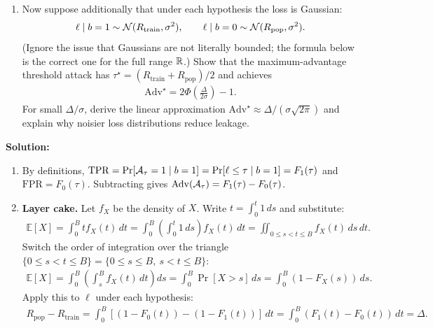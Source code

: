 \documentclass[12pt]{article}
\newcommand{\fE}{\mathbb{E}}
\begin{document}
\begin{enumerate}
\begin{enumerate}
    \item Now suppose additionally that under each hypothesis the loss is Gaussian:
    \begin{align*}
        \ell \mid b=1 \sim {\mathcal{N}}(R_{\mathrm{train}}, \sigma^2), \qquad \ell \mid b=0 \sim {\mathcal{N}}(R_{\mathrm{pop}}, \sigma^2).
    \end{align*}
    (Ignore the issue that Gaussians are not literally bounded; the formula below is the correct one for the full range ${\mathbb{R}}$.) Show that the maximum-advantage threshold attack has $\tau^\star = (R_{\mathrm{train}} + R_{\mathrm{pop}})/2$ and achieves
    \begin{align*}
        \mathrm{Adv}^\star = 2\Phi\!\left(\frac{\Delta}{2\sigma}\right) - 1.
    \end{align*}
    For small $\Delta/\sigma$, derive the linear approximation $\mathrm{Adv}^\star \approx \Delta/(\sigma\sqrt{2\pi})$ and explain why noisier loss distributions reduce leakage.
\end{enumerate}

\begin{solution}
{\bf Solution:}\\
\begin{enumerate}
    \item By definitions, $\mathrm{TPR} = \Pr[{\mathcal{A}}_\tau = 1 \mid b = 1] = \Pr[\ell \le \tau \mid b = 1] = F_1(\tau)$ and $\mathrm{FPR} = F_0(\tau)$. Subtracting gives $\mathrm{Adv}({\mathcal{A}}_\tau) = F_1(\tau) - F_0(\tau)$.

    \item \textbf{Layer cake.} Let $f_X$ be the density of $X$. Write $t = \int_0^t 1\,ds$ and substitute:
    \begin{align*}
        \fE[X] = \int_0^B t f_X(t)\,dt = \int_0^B \!\!\left(\int_0^t 1\,ds\right) f_X(t)\,dt = \iint_{0 \le s < t \le B} f_X(t)\,ds\,dt.
    \end{align*}
    Switch the order of integration over the triangle $\{0 \le s < t \le B\} = \{0 \le s \le B,\ s < t \le B\}$:
    \begin{align*}
        \fE[X] = \int_0^B \!\!\left(\int_s^B f_X(t)\,dt\right) ds = \int_0^B \Pr[X > s]\,ds = \int_0^B (1 - F_X(s))\,ds.
    \end{align*}
    Apply this to $\ell$ under each hypothesis:
    \begin{align*}
        R_{\mathrm{pop}} - R_{\mathrm{train}} = \int_0^B [(1 - F_0(t)) - (1 - F_1(t))]\,dt = \int_0^B (F_1(t) - F_0(t))\,dt = \Delta.
    \end{align*}


\end{enumerate}
\end{solution}
\end{enumerate}
\end{document}

